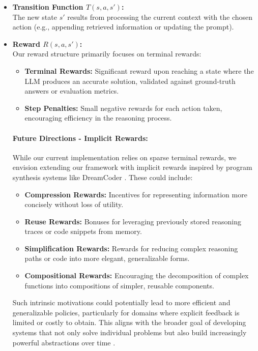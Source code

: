 \documentclass[10pt,journal,compsoc]{IEEEtran}
\begin{document}
\begin{itemize}
\item
  \textbf{Transition Function $T(s,a,s')$:}\\
  The new state $s'$ results from processing the current context with
  the chosen action (e.g., appending retrieved information or updating
  the prompt).
\item
  \textbf{Reward $R(s,a,s')$:}\\
  Our reward structure primarily focuses on terminal rewards:
  \begin{itemize}
    \item \textbf{Terminal Rewards:} Significant reward upon reaching a state where the LLM produces an accurate solution, validated against ground-truth answers or evaluation metrics.
    \item \textbf{Step Penalties:} Small negative rewards for each action taken, encouraging efficiency in the reasoning process.
  \end{itemize}
  
  \paragraph{Future Directions - Implicit Rewards:}
  While our current implementation relies on sparse terminal rewards, we envision extending our framework with implicit rewards inspired by program synthesis systems like DreamCoder \citep{ellis2021dreamcoder}. These could include:
  \begin{itemize}
    \item \textbf{Compression Rewards:} Incentives for representing information more concisely without loss of utility.
    \item \textbf{Reuse Rewards:} Bonuses for leveraging previously stored reasoning traces or code snippets from memory.
    \item \textbf{Simplification Rewards:} Rewards for reducing complex reasoning paths or code into more elegant, generalizable forms.
    \item \textbf{Compositional Rewards:} Encouraging the decomposition of complex functions into compositions of simpler, reusable components.
  \end{itemize}
  
  Such intrinsic motivations could potentially lead to more efficient and generalizable policies, particularly for domains where explicit feedback is limited or costly to obtain. This aligns with the broader goal of developing systems that not only solve individual problems but also build increasingly powerful abstractions over time \citep{lake2017building}.
\end{itemize}
\end{document}
